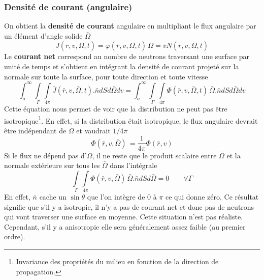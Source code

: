 \subsubsection{Densité de courant (angulaire)}
On obtient la \textbf{densité de courant} angulaire en multipliant le flux angulaire par un élément d'angle solide 
$\bar\Omega$
\begin{equation}
\bar J(\bar r,v,\bar \Omega ,t) = \varphi (\bar r,v,\bar \Omega ,t)\,\bar \Omega  = \bar vN(\bar r,v,\bar \Omega ,t)
\end{equation}
Le \textbf{courant net} correspond au nombre de neutrons traversant une surface par unité de temps et s'obtient en
intégrant la densité de courant projeté sur la normale sur toute la surface, pour toute direction et toute vitesse
\begin{equation}
\int_o^\infty     \int\limits_\Gamma  {\int\limits_{4\pi }    } \bar J(\bar r,v,\bar \Omega ,t).\bar ndSd\bar \Omega dv = \int_o^\infty     \int\limits_\Gamma  {\int\limits_{4\pi }   } \varPhi (\bar r,v,\bar \Omega ,t)\,\bar \Omega .\bar ndSd\bar \Omega dv
\end{equation}
Cette équation nous permet de voir que la distribution ne peut pas être 
isotropique\footnote{Invariance des propriétés du milieu en fonction de la direction de propagation.}.
En effet, si la distribution était isotropique, le flux angulaire devrait être indépendant de 
$\Omega$ et vaudrait $1/4\pi$
\begin{equation}
\varPhi (\bar r,v,\bar \Omega )\, = \frac{1}{{4\pi }}\varPhi (\bar r,v)
\end{equation}
Si le flux ne dépend pas d'$\bar\Omega$, il ne reste que le produit scalaire entre $\bar\Omega$ et 
la normale extérieure sur tous les $\bar\Omega$ dans l'intégrale
\begin{equation}
\int\limits_\Gamma  {\int\limits_{4\pi }    } \varPhi (\bar r,v,\bar \Omega )\,\bar \Omega .\bar ndSd\bar \Omega  = 0\qquad \forall \Gamma 
\end{equation}
En effet, $\bar n$ cache un $\sin\theta$ que l'on intègre de 0 à $\pi$ ce qui donne zéro. Ce 
résultat signifie que s'il y a isotropie, il n'y a pas de courant net et donc pas de neutrons qui 
vont traverser une surface en moyenne. Cette situation n'est pas réaliste. Cependant, s'il y a anisotropie elle 
sera généralement assez faible (au premier ordre).


